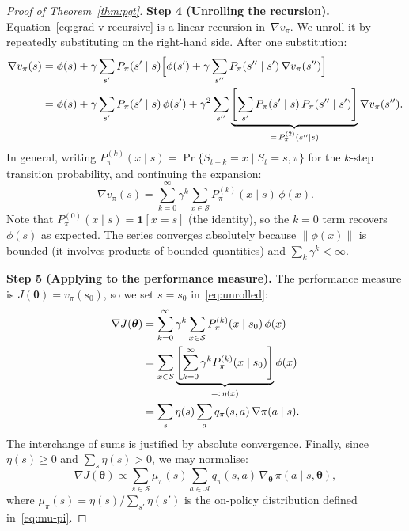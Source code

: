 \begin{proof}[Proof of Theorem~\ref{thm:pgt}]
\medskip\noindent\textbf{Step 4 (Unrolling the recursion).}\quad
Equation~\eqref{eq:grad-v-recursive} is a linear recursion in~$\nabla v_\pi$. We unroll it by repeatedly substituting on the right-hand side. After one substitution:
\begin{align*}
  \nabla v_\pi(s)
  &= \phi(s) + \gamma\sum_{s'} P_\pi(s'\mid s)\Bigl[\phi(s') + \gamma\sum_{s''} P_\pi(s''\mid s')\,\nabla v_\pi(s'')\Bigr] \\
  &= \phi(s) + \gamma\sum_{s'} P_\pi(s'\mid s)\,\phi(s') + \gamma^2\sum_{s''}\underbrace{\left[\sum_{s'} P_\pi(s'\mid s)\,P_\pi(s''\mid s')\right]}_{=\,P_\pi^{(2)}(s''\mid s)}\nabla v_\pi(s'').
\end{align*}
In general, writing $P_\pi^{(k)}(x\mid s) = \Pr\{S_{t+k}=x\mid S_t=s,\pi\}$ for the $k$-step transition probability, and continuing the expansion:
\begin{equation}\label{eq:unrolled}
  \nabla v_\pi(s) = \sum_{k=0}^{\infty}\gamma^k\sum_{x\in\mathcal{S}} P_\pi^{(k)}(x\mid s)\,\phi(x).
\end{equation}
Note that $P_\pi^{(0)}(x\mid s)=\mathbf{1}[x=s]$ (the identity), so the $k=0$ term recovers~$\phi(s)$ as expected. The series converges absolutely because $\|\phi(x)\|$ is bounded (it involves products of bounded quantities) and $\sum_k\gamma^k<\infty$.

\medskip\noindent\textbf{Step 5 (Applying to the performance measure).}\quad
The performance measure is $J(\bm{\theta})=v_\pi(s_0)$, so we set $s=s_0$ in~\eqref{eq:unrolled}:
\begin{align}
  \nabla J(\bm{\theta})
  &= \sum_{k=0}^{\infty}\gamma^k\sum_{x\in\mathcal{S}} P_\pi^{(k)}(x\mid s_0)\,\phi(x) \notag \\
  &= \sum_{x\in\mathcal{S}} \underbrace{\left[\sum_{k=0}^{\infty}\gamma^k P_\pi^{(k)}(x\mid s_0)\right]}_{=:\,\eta(x)} \phi(x) \notag \\
  &= \sum_s \eta(s)\sum_a q_\pi(s,a)\,\nabla\pi(a\mid s). \label{eq:pgt-eta-form}
\end{align}
The interchange of sums is justified by absolute convergence. Finally, since $\eta(s)\ge 0$ and $\sum_s\eta(s)>0$, we may normalise:
\begin{equation}\label{eq:pgt-final}
  \nabla J(\bm{\theta}) \propto \sum_{s\in\mathcal{S}} \mu_\pi(s)\sum_{a\in\mathcal{A}} q_\pi(s,a)\,\nabla_{\bm{\theta}}\,\pi(a\mid s,\bm{\theta}),
\end{equation}
where $\mu_\pi(s)=\eta(s)/\sum_{s'}\eta(s')$ is the on-policy distribution defined in~\eqref{eq:mu-pi}.
\end{proof}

